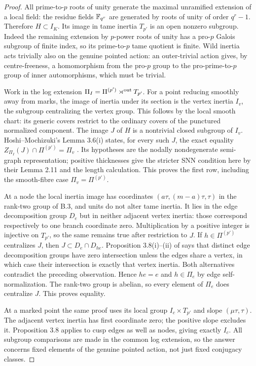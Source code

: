 \begin{proof}
All prime-to-$p$ roots of unity generate the maximal unramified extension
of a local field: the residue fields $\mathbb F_{q^r}$ are generated by roots of
unity of order $q^r-1$. Therefore $H\subset I_K$. Its image in tame inertia
$T_{p'}$ is an open nonzero subgroup. Indeed the remaining extension by
$p$-power roots of unity has a pro-$p$ Galois subgroup of finite index,
so its prime-to-$p$ tame quotient is finite. Wild inertia acts trivially
also on the genuine pointed action: an outer-trivial action gives, by
centre-freeness, a homomorphism from the pro-$p$ group to the pro-prime-to-$p$
group of inner automorphisms, which must be trivial.

Work in the log extension $\Pi_I=\Pi^{(p')}\rtimes^{\rm out}T_{p'}$.
For a point reducing smoothly away from marks, the image of inertia under
its section is the vertex inertia $I_v$, the subgroup centralizing the
vertex group. This follows by the local smooth chart: its generic covers
restrict to the ordinary covers of the punctured normalized component.
The image $J$ of $H$ is a nontrivial closed subgroup of $I_v$.
Hoshi--Mochizuki's Lemma 3.6(i) states, for every such $J$, the exact
equality
$Z_{\Pi_I}(J)\cap\Pi^{(p')}=\Pi_v$
\citep[Lemma 3.6]{BC_HMNodes}. Its hypotheses are the nodally nondegenerate
semi-graph representation; positive thicknesses give the stricter SNN
condition here by their Lemma 2.11 and the length calculation. This proves
the first row, including the smooth-fibre case $\Pi_v=\Pi^{(p')}$.

At a node the local inertia image has coordinates
$(a\tau,(m-a)\tau,\tau)$ in the rank-two group of B.3, and units do not
alter tame inertia. It lies in the edge decomposition group $D_e$ but in
neither adjacent vertex inertia: those correspond respectively to one
branch coordinate zero. Multiplication by a positive integer is injective
on $T_{p'}$, so the same remains true after restriction to $J$.
If $h\in\Pi^{(p')}$ centralizes $J$, then
$J\subset D_e\cap D_{he}$. Proposition 3.8(i)--(ii) of
\citet{BC_HMNodes} says that distinct edge decomposition groups have zero
intersection unless the edges share a vertex, in which case their
intersection is exactly that vertex inertia. Both alternatives contradict
the preceding observation. Hence $he=e$ and $h\in\Pi_e$ by edge
self-normalization. The rank-two group is abelian, so every element of
$\Pi_e$ does centralize $J$. This proves equality.

At a marked point the same proof uses its local group
$I_c\times T_{p'}$ and slope $(\mu\tau,\tau)$. The adjacent vertex inertia
has first coordinate zero; the positive slope excludes it. Proposition
3.8 applies to cusp edges as well as nodes, giving exactly $I_c$.
All subgroup comparisons are made in the common log extension, so the
answer concerns fixed elements of the genuine pointed action, not just
fixed conjugacy classes.
\end{proof}

